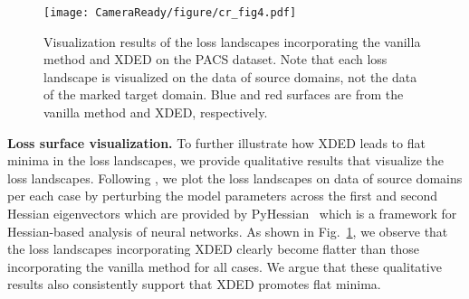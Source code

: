 \documentclass[runningheads]{llncs}
\begin{document}
\begin{figure}[t]
    \centering
    \texttt{[image: CameraReady/figure/cr\_fig4.pdf]}
    \caption{Visualization results of the loss landscapes incorporating the vanilla method and XDED on the PACS dataset. Note that each loss landscape is visualized on the data of source domains, not the data of the marked target domain. Blue and red surfaces are from the vanilla method and XDED, respectively.
    }
\label{fig:loss_surface}
\end{figure}

\noindent \textbf{Loss surface visualization.}
To further illustrate how XDED leads to flat minima in the loss landscapes, we provide qualitative results that visualize the loss landscapes. Following \cite{cha2020cpr}, we plot the loss landscapes on data of source domains per each case by perturbing the model parameters across the first and second Hessian eigenvectors which are provided by PyHessian~\cite{yao2020pyhessian} which is a framework for Hessian-based analysis of neural networks. As shown in Fig.~\ref{fig:loss_surface}, we observe that the loss landscapes incorporating XDED clearly become flatter than those incorporating the vanilla method for all cases. We argue that these qualitative results also consistently support that XDED promotes flat minima.
\end{document}
